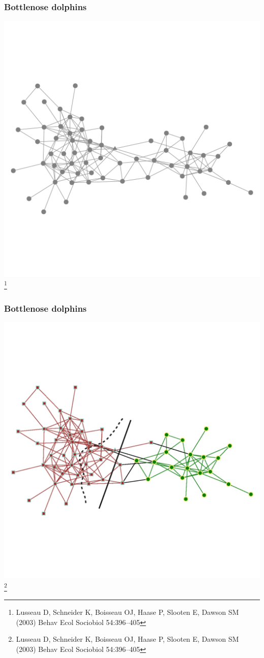 \documentclass{beamer}
\begin{document}
\begin{frame}
    \frametitle{Bottlenose dolphins}
    \centering
    \includegraphics[width=\columnwidth, trim = 0 120 0 100, clip = true]{dolphins.pdf}
\footnote{\footnotesize Lusseau D, Schneider K, Boisseau OJ, Haase P, Slooten E, Dawson SM (2003) Behav Ecol Sociobiol 54:396–405}
\end{frame}
\begin{frame}
    \frametitle{Bottlenose dolphins}
    \centering
    \includegraphics[width=\columnwidth, trim = 0 120 0 100, clip = true]{dolphins_communities.pdf}
\footnote{\footnotesize Lusseau D, Schneider K, Boisseau OJ, Haase P, Slooten E, Dawson SM (2003) Behav Ecol Sociobiol 54:396–405}
\end{frame}
\end{document}
